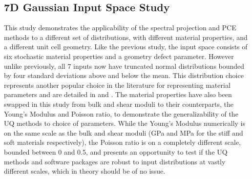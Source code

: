\documentclass[preprint,review,12pt]{elsarticle}
\begin{document}
    


\subsection{7D Gaussian Input Space Study}
\label{subsec:7D Gaussian Input Space}
This study demonstrates the applicability of the spectral projection and PCE methods to a different set of distributions, with different material properties, and a different unit cell geometry. Like the previous study, the input space consists of six stochastic material properties and a geometry defect parameter. However unlike previously, all 7 inputs now have truncated normal distributions bounded by four standard deviations above and below the mean. This distribution choice represents another popular choice in the literature for representing material parameters and are detailed in  and . The material properties have also been swapped in this study from bulk and shear moduli to their counterparts, the Young's Modulus and Poisson ratio, to demonstrate the generalizability of the UQ methods to choice of parameters. While the Young's Modulus numerically is on the same scale as the bulk and shear moduli (GPa and MPa for the stiff and soft materials respectively), the Poisson ratio is on a completely different scale, bounded between 0 and 0.5, and presents an opportunity to test if the UQ methods and software packages are robust to input distributions at vastly different scales, which in theory should be of no issue.
\end{document}
